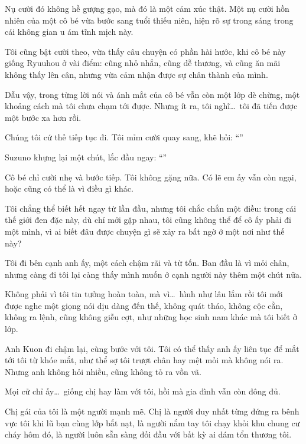 \documentclass[../main.tex]{subfiles}
\begin{document}
Nụ cười đó không hề gượng gạo, mà đó là một cảm xúc thật. Một nụ cười hồn nhiên của một cô bé vừa bước sang tuổi thiếu niên, hiện rõ sự trong sáng trong cái không gian u ám tĩnh mịch này.

Tôi cũng bật cười theo, vừa thấy câu chuyện có phần hài hước, khi cô bé này giống Ryuuhou ở vài điểm: cũng nhỏ nhắn, cũng dễ thương, và cũng ăn mãi không thấy lên cân, nhưng vừa cảm nhận được sự chân thành của mình.

Dẫu vậy, trong từng lời nói và ánh mắt của cô bé vẫn còn một lớp dè chừng, một khoảng cách mà tôi chưa chạm tới được. Nhưng ít ra, tôi nghĩ\dots\ tôi đã tiến được một bước xa hơn rồi.

Chúng tôi cứ thế tiếp tục đi. Tôi mỉm cười quay sang, khẽ hỏi: ``''

Suzuno khựng lại một chút, lắc đầu ngay: ``''

Cô bé chỉ cười nhẹ và bước tiếp. Tôi không gặng nữa. Có lẽ em ấy vẫn còn ngại, hoặc cũng có thể là vì điều gì khác.

Tôi chẳng thể biết hết ngay từ lần đầu, nhưng tôi chắc chắn một điều: trong cái thế giới đen đặc này, dù chỉ mới gặp nhau, tôi cũng không thể để cô ấy phải đi một mình, vì ai biết đâu được chuyện gì sẽ xảy ra bất ngờ ở một nơi như thế này?

\ct


Tôi đi bên cạnh anh ấy, một cách chậm rãi và từ tốn. Ban đầu là vì mỏi chân, nhưng càng đi tôi lại càng thấy mình muốn ở cạnh người này thêm một chút nữa.

Không phải vì tôi tin tưởng hoàn toàn, mà vì\dots\ hình như lâu lắm rồi tôi mới được nghe một giọng nói dịu dàng đến thế, không quát tháo, không cộc cằn, không ra lệnh, cũng không giễu cợt, như những học sinh nam khác mà tôi biết ở lớp.

Anh Kuon đi chậm lại, cùng bước với tôi. Tôi có thể thấy anh ấy liên tục để mắt tới tôi từ khóe mắt, như thể sợ tôi trượt chân hay mệt mỏi mà không nói ra. Nhưng anh không hỏi nhiều, cũng không tỏ ra vồn vã.

Mọi cử chỉ ấy\dots\ giống chị hay làm với tôi, hồi mà gia đình vẫn còn đông đủ.

Chị gái của tôi là một người mạnh mẽ. Chị là người duy nhất từng đứng ra bênh vực tôi khi lũ bạn cùng lớp bắt nạt, là người nắm tay tôi chạy khỏi khu chung cư cháy hôm đó, là người luôn sẵn sàng đối đầu với bất kỳ ai dám tổn thương tôi.
\end{document}
